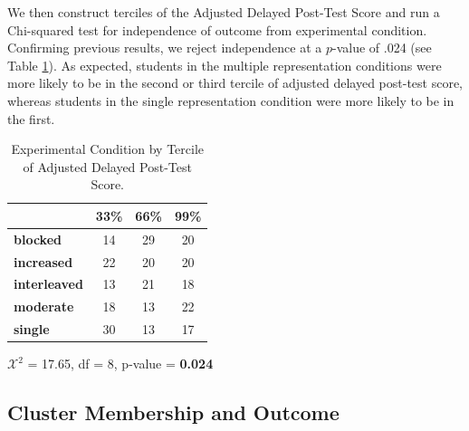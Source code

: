 \documentclass{edm_template}
\begin{document}
We then construct terciles of the Adjusted Delayed Post-Test Score and run a Chi-squared test for independence of outcome from experimental condition. Confirming previous results, we reject independence at a $p$-value of .024 (see Table \ref{tab:exp-and-score}). As expected, students in the multiple representation conditions were more likely to be in the second or third tercile of adjusted delayed post-test score, whereas students in the single representation condition were more likely to be in the first.

\begin{table}[hbtp]

\centering
\begin{tabular}{|l || c | c | c |}
\hline
&33\%&66\%&99\%\\ \hline \hline
  \textbf{blocked}  &   14& 29& 20 \\ \hline
  \textbf{increased}&   22& 20& 20 \\ \hline
\textbf{interleaved}& 13& 21& 18 \\ \hline
  \textbf{moderate} &   18& 13& 22 \\ \hline
    \textbf{single} &      30& 13& 17 \\ \hline
 \end{tabular}
  \begin{center} $\mathcal{X}^2$ = 17.65, df = 8, p-value = {\bf 0.024} \end{center}
 \caption{Experimental Condition by Tercile of Adjusted Delayed Post-Test Score.}
\label{tab:exp-and-score}
\end{table}


\subsection{Cluster Membership and Outcome}
\end{document}
